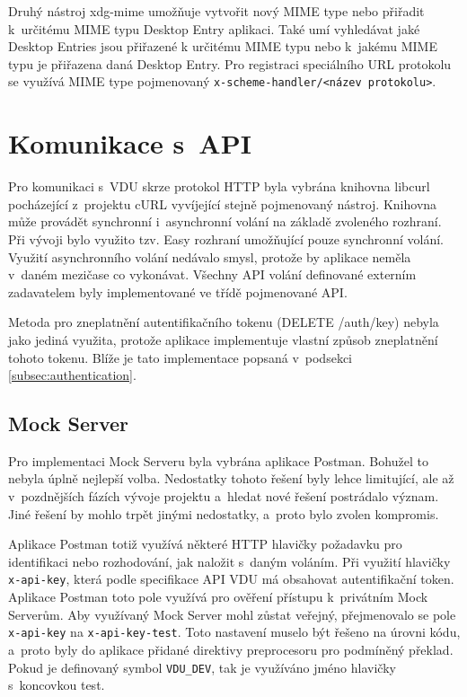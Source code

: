 Druhý nástroj xdg-mime umožňuje vytvořit nový MIME type nebo přiřadit k určitému MIME typu Desktop Entry aplikaci. Také umí vyhledávat jaké Desktop Entries jsou přiřazené
k určitému MIME typu nebo k jakému MIME typu je přiřazena daná Desktop Entry. Pro registraci speciálního URL protokolu se využívá MIME type pojmenovaný 
\texttt{\mbox{x-scheme-handler/<název protokolu>}}. \cite{xdg}

\section{Komunikace s API}

Pro komunikaci s VDU skrze protokol HTTP byla vybrána knihovna libcurl pocházející z projektu cURL vyvíjející stejně pojmenovaný nástroj. Knihovna může provádět
synchronní i asynchronní volání na základě zvoleného rozhraní. Při vývoji bylo využito tzv. Easy rozhraní umožňující pouze synchronní volání. Využití asynchronního volání
nedávalo smysl, protože by aplikace neměla v daném mezičase co vykonávat. Všechny API volání definované externím zadavatelem byly implementované ve třídě pojmenované API.

Metoda pro zneplatnění autentifikačního tokenu (DELETE /auth/key) nebyla jako jediná využita, protože aplikace implementuje vlastní způsob zneplatnění tohoto tokenu. Blíže 
je tato implementace popsaná v podsekci \ref{subsec:authentication}.

\subsection{Mock Server}

Pro implementaci Mock Serveru byla vybrána aplikace Postman. Bohužel to nebyla úplně nejlepší volba. Nedostatky tohoto řešení byly lehce limitující, ale až v pozdnějších
fázích vývoje projektu a hledat nové řešení postrádalo význam. Jiné řešení by mohlo trpět jinými nedostatky, a proto bylo zvolen kompromis.

Aplikace Postman totiž využívá některé HTTP hlavičky požadavku pro identifikaci nebo rozhodování, jak naložit s daným voláním. Při využití hlavičky \texttt{x-api-key}, která
podle specifikace API VDU má obsahovat autentifikační token. Aplikace Postman toto pole využívá pro ověření přístupu k privátním Mock Serverům. Aby využívaný
Mock Server mohl zůstat veřejný, přejmenovalo se pole \texttt{x-api-key} na \texttt{x-api-key-test}. Toto nastavení muselo být řešeno na úrovni kódu, a proto byly do aplikace 
přidané direktivy preprocesoru pro podmíněný překlad. Pokud je definovaný symbol \texttt{VDU\_DEV}, tak je využíváno jméno hlavičky s koncovkou test.

